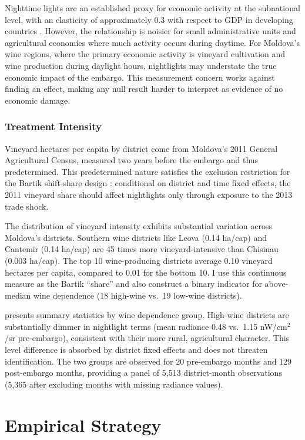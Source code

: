 \documentclass[12pt]{article}
\begin{document}
Nighttime lights are an established proxy for economic activity at the subnational level, with an elasticity of approximately 0.3 with respect to GDP in developing countries \citep{henderson2012measuring, gibson2020night}. However, the relationship is noisier for small administrative units and agricultural economies where much activity occurs during daytime. For Moldova's wine regions, where the primary economic activity is vineyard cultivation and wine production during daylight hours, nightlights may understate the true economic impact of the embargo. This measurement concern works against finding an effect, making any null result harder to interpret as evidence of no economic damage.

\subsubsection*{Treatment Intensity} Vineyard hectares per capita by district come from Moldova's 2011 General Agricultural Census, measured two years before the embargo and thus predetermined. This predetermined nature satisfies the exclusion restriction for the Bartik shift-share design \citep{goldsmith2020bartik, borusyak2022quasi}: conditional on district and time fixed effects, the 2011 vineyard share should affect nightlights only through exposure to the 2013 trade shock.

The distribution of vineyard intensity exhibits substantial variation across Moldova's districts. Southern wine districts like Leova (0.14 ha/cap) and Cantemir (0.14 ha/cap) are 45 times more vineyard-intensive than Chisinau (0.003 ha/cap). The top 10 wine-producing districts average 0.10 vineyard hectares per capita, compared to 0.01 for the bottom 10. I use this continuous measure as the Bartik ``share'' and also construct a binary indicator for above-median wine dependence (18 high-wine vs.\ 19 low-wine districts).

 presents summary statistics by wine dependence group. High-wine districts are substantially dimmer in nightlight terms (mean radiance 0.48 vs.\ 1.15 nW/cm$^2$/sr pre-embargo), consistent with their more rural, agricultural character. This level difference is absorbed by district fixed effects and does not threaten identification. The two groups are observed for 20 pre-embargo months and 129 post-embargo months, providing a panel of 5,513 district-month observations (5,365 after excluding months with missing radiance values).

\section{Empirical Strategy}
\end{document}
